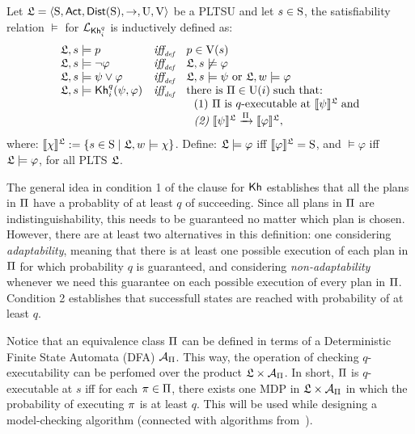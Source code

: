 \begin{definition} \label{def:semantics}
    Let $\model = \tup{\S,\ACT,\dist(\S),\ra,\Unc,\V}$ be a PLTSU and let $s\in\S$, the satisfiability relation $\models$ for $\PKhunc$ is inductively defined as:
    \[
    \begin{array}{l@{\ \ \ }c@{\ \ \  }l}
    \model, s \models p & \iffdef & p \in \V(s) \\
    \model, s\models \neg\varphi & \iffdef & \model, s \not\models \varphi \\
    \model, s \models \psi\vee\varphi & \iffdef & \model, s \models \psi \mbox{ or }\model, w \models \varphi \\
    \model, s \models \kh_i^q(\psi,\varphi) & \iffdef & \text{there is } \plans \in \Unc(i) \;\text{such that:} \\
    & & \ \ \text{\rm (1)} \ \plans \text{ is $q$-executable at }  \truthset{\model}{\psi}\; \text{and} \\
    & & \ \ \text{\em (2)} \ \truthset{\model}{\psi} \reach{\plans} \truthset{\model}{\varphi}, 
    \end{array}
    \]     
    \noindent where: $\truthset{\model}{\chi} := \csetsc{s\in\S}{\model,w\models\chi}$. Define: $\model\models\varphi$ iff  $\truthset{\model}{\varphi}=\S$, and $\models\varphi$ iff $\model\models\varphi$, for all PLTS $\model$.
\end{definition}

The general idea in condition 1 of the clause for $\kh$ establishes that all the plans in $\plans$ have a probablity of at least $q$ of succeeding. Since all plans in $\plans$ are indistinguishability, this needs to be guaranteed no matter which plan is chosen. However, there are at least two alternatives in this definition: one considering \emph{adaptability}, meaning that there is at least one possible execution of each plan in $\plans$ for which probability $q$ is guaranteed, and considering \emph{non-adaptability} whenever we need this guarantee on each possible execution of every plan in $\plans$. Condition 2 establishes that successfull states are reached with probability of at least $q$.

\begin{remark}
    Notice that an equivalence class $\plans$ can be defined in terms of a Deterministic Finite State Automata (DFA) $\mathcal{A}_{\plans}$. This way, the operation of checking $q$-executability can be perfomed over the product $\model\times\mathcal{A}_{\plans}$. In short, $\plans$ is $q$-executable at $s$ iff for each $\plan\in\plans$, there exists one MDP in  $\model\times\mathcal{A}_{\plans}$ in which the probability of executing $\plan$ is at least $q$. This will be used while designing a model-checking algorithm (connected with algorithms from~\cite{AFSVQ21,AFSVQ23,DF23}).
\end{remark}